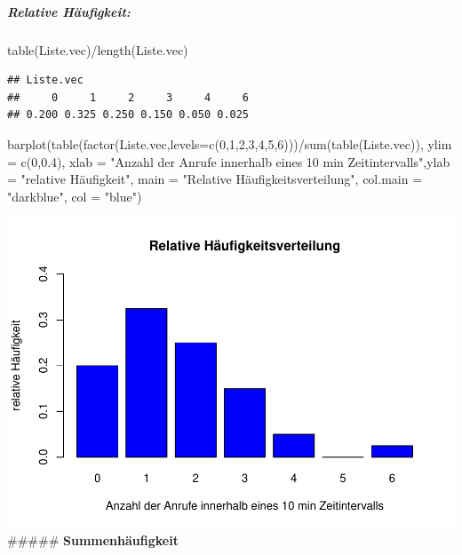 \documentclass[
]{article}
\newenvironment{Shaded}{\begin{snugshade}}{\end{snugshade}}
\newcommand{\AttributeTok}[1]{\textcolor[rgb]{0.77,0.63,0.00}{#1}}
\newcommand{\DecValTok}[1]{\textcolor[rgb]{0.00,0.00,0.81}{#1}}
\newcommand{\FloatTok}[1]{\textcolor[rgb]{0.00,0.00,0.81}{#1}}
\newcommand{\FunctionTok}[1]{\textcolor[rgb]{0.00,0.00,0.00}{#1}}
\newcommand{\NormalTok}[1]{#1}
\newcommand{\SpecialCharTok}[1]{\textcolor[rgb]{0.00,0.00,0.00}{#1}}
\newcommand{\StringTok}[1]{\textcolor[rgb]{0.31,0.60,0.02}{#1}}
\begin{document}
\hypertarget{relative-huxe4ufigkeit}{%
\subparagraph{\texorpdfstring{\textbf{Relative
Häufigkeit:}}{Relative Häufigkeit:}}\label{relative-huxe4ufigkeit}}

\begin{Shaded}
\begin{Highlighting}[]
\FunctionTok{table}\NormalTok{(Liste.vec)}\SpecialCharTok{/}\FunctionTok{length}\NormalTok{(Liste.vec)}
\end{Highlighting}
\end{Shaded}

\begin{verbatim}
## Liste.vec
##     0     1     2     3     4     6 
## 0.200 0.325 0.250 0.150 0.050 0.025
\end{verbatim}

\begin{Shaded}
\begin{Highlighting}[]
\FunctionTok{barplot}\NormalTok{(}\FunctionTok{table}\NormalTok{(}\FunctionTok{factor}\NormalTok{(Liste.vec,}\AttributeTok{levels=}\FunctionTok{c}\NormalTok{(}\DecValTok{0}\NormalTok{,}\DecValTok{1}\NormalTok{,}\DecValTok{2}\NormalTok{,}\DecValTok{3}\NormalTok{,}\DecValTok{4}\NormalTok{,}\DecValTok{5}\NormalTok{,}\DecValTok{6}\NormalTok{)))}\SpecialCharTok{/}\FunctionTok{sum}\NormalTok{(}\FunctionTok{table}\NormalTok{(Liste.vec)), }\AttributeTok{ylim =} \FunctionTok{c}\NormalTok{(}\DecValTok{0}\NormalTok{,}\FloatTok{0.4}\NormalTok{), }\AttributeTok{xlab =} \StringTok{"Anzahl der Anrufe innerhalb eines 10 min Zeitintervalls"}\NormalTok{,}\AttributeTok{ylab =} \StringTok{"relative Häufigkeit"}\NormalTok{, }\AttributeTok{main =} \StringTok{"Relative Häufigkeitsverteilung"}\NormalTok{, }\AttributeTok{col.main =} \StringTok{"darkblue"}\NormalTok{, }\AttributeTok{col =} \StringTok{"blue"}\NormalTok{)}
\end{Highlighting}
\end{Shaded}

\includegraphics{Uebung1_StefanDuenser_files/figure-latex/unnamed-chunk-5-1.pdf}
\#\#\#\#\# \textbf{Summenhäufigkeit}
\end{document}
